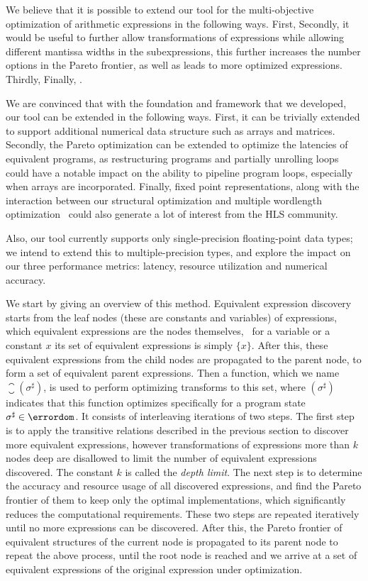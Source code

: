 We believe that it is possible to extend our tool for the multi-objective
optimization of arithmetic expressions in the following ways. First, Secondly,
it would be useful to further allow transformations of expressions while
allowing different mantissa widths in the subexpressions, this further
increases the number options in the Pareto frontier, as well as leads to more
optimized expressions. Thirdly, Finally, .

We are convinced that with the foundation and framework that we developed,
our tool can be extended in the following ways.  First, it can be trivially
extended to support additional numerical data structure such as arrays and
matrices.  Secondly, the Pareto optimization can be extended to optimize the
latencies of equivalent programs, as restructuring programs and partially
unrolling loops could have a notable impact on the ability to pipeline
program loops, especially when arrays are incorporated.  Finally, fixed point
representations, along with the interaction between our structural optimization
and multiple wordlength optimization~\cite{constantinides} could also generate
a lot of interest from the HLS community.

 Also, our tool currently supports only single-precision
floating-point data types; we intend to extend this to multiple-precision
types, and explore the impact on our three performance metrics: latency,
resource utilization and numerical accuracy.


We start by giving an overview of this method.  Equivalent expression discovery
starts from the leaf nodes (these are constants and variables) of expressions,
which equivalent expressions are the nodes themselves, \ie~for a variable or a
constant $x$ its set of equivalent expressions is simply $\{x\}$.  After this,
these equivalent expressions from the child nodes are propagated to the parent
node, to form a set of equivalent parent expressions.  Then a function, which
we name $\closure(\sigma^\sharp)$, is used to perform optimizing transforms
to this set, where $(\sigma^\sharp)$ indicates that this function optimizes
specifically for a program state $\sigma^\sharp \in \errordom$.  It consists
of interleaving iterations of two steps.  The first step is to apply the
transitive relations described in the previous section to discover more
equivalent expressions, however transformations of expressions more than
$k$ nodes deep are disallowed to limit the number of equivalent expressions
discovered.  The constant $k$ is called the \emph{depth limit}.  The next step
is to determine the accuracy and resource usage of all discovered expressions,
and find the Pareto frontier of them to keep only the optimal implementations,
which significantly reduces the computational requirements.  These two steps
are repeated iteratively until no more expressions can be discovered.  After
this, the Pareto frontier of equivalent structures of the current node is
propagated to its parent node to repeat the above process, until the root node
is reached and we arrive at a set of equivalent expressions of the original
expression under optimization.

